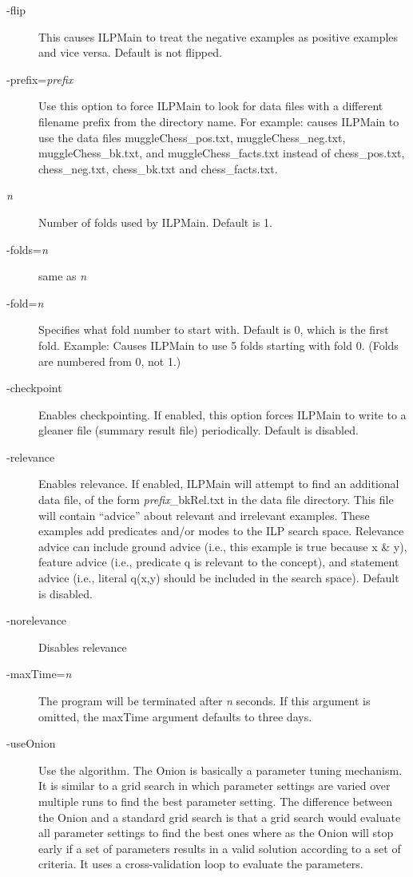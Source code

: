 \documentclass{article}
\begin{document}
\begin{description}
\item[-flip] This causes ILPMain to treat the negative examples as positive examples and vice versa.  Default is not flipped.
\item[-prefix=\emph{prefix}] Use this option to force ILPMain to look for data files with a different filename prefix from the directory name.  For example:
causes ILPMain to use the data files muggleChess\_pos.txt, muggleChess\_neg.txt, muggleChess\_bk.txt, and muggleChess\_facts.txt instead of chess\_pos.txt, chess\_neg.txt, chess\_bk.txt and chess\_facts.txt.
\item[\emph{n}] Number of folds used by ILPMain.  Default is 1.
\item[-folds=\emph{n}] same as 
\emph{n}
\item[-fold=\emph{n}] Specifies what fold number to start with.  Default is 0, which is the first fold.
Example: 
Causes ILPMain to use 5 folds starting with fold 0.  (Folds are numbered from 0, not 1.)
\item[-checkpoint] Enables checkpointing.  If enabled, this option forces ILPMain to write to a gleaner file (summary result file) periodically.   Default is disabled.
\item[-relevance]  Enables relevance.  If enabled, ILPMain will attempt to find an additional data file, of the form
\emph{prefix}\_bkRel.txt in the data file directory.  This file will contain ``advice'' about relevant and irrelevant
examples.  These examples add predicates and/or modes to the ILP search space.  Relevance advice can include ground
advice (i.e., this example is true because x \& y), feature advice (i.e., predicate q is relevant to the concept), and
statement advice (i.e., literal q(x,y) should be included in the search space). Default is disabled.
\item[-norelevance] Disables relevance
\item[-maxTime=\emph{n}] The program will be terminated after \emph{n} seconds.  If this argument is omitted, the maxTime argument defaults to three days.
\item[-useOnion] Use the \onion algorithm. The Onion is basically a parameter tuning mechanism.  It is similar to a grid search in which parameter settings are varied over multiple runs to find the best parameter setting.  The difference between the Onion and a standard grid search is that a grid search would evaluate all parameter settings to find the best ones where as the Onion will stop early if a set of parameters results in a valid solution according to a set of criteria.  It uses a cross-validation loop to evaluate the parameters. 


\end{description}
\end{document}
